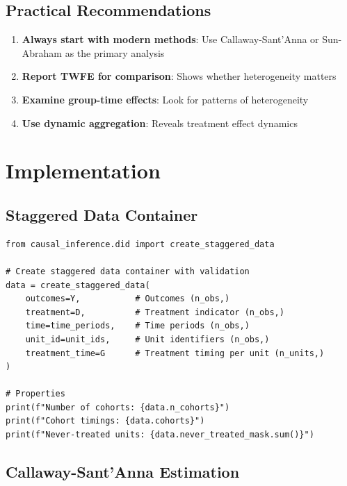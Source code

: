 \subsection{Practical Recommendations}

\begin{enumerate}
    \item \textbf{Always start with modern methods}: Use Callaway-Sant'Anna or Sun-Abraham as the primary analysis
    \item \textbf{Report TWFE for comparison}: Shows whether heterogeneity matters
    \item \textbf{Examine group-time effects}: Look for patterns of heterogeneity
    \item \textbf{Use dynamic aggregation}: Reveals treatment effect dynamics
\end{enumerate}

\section{Implementation}
\label{sec:modern_implementation}

\subsection{Staggered Data Container}

\begin{verbatim}
from causal_inference.did import create_staggered_data

# Create staggered data container with validation
data = create_staggered_data(
    outcomes=Y,           # Outcomes (n_obs,)
    treatment=D,          # Treatment indicator (n_obs,)
    time=time_periods,    # Time periods (n_obs,)
    unit_id=unit_ids,     # Unit identifiers (n_obs,)
    treatment_time=G      # Treatment timing per unit (n_units,)
)

# Properties
print(f"Number of cohorts: {data.n_cohorts}")
print(f"Cohort timings: {data.cohorts}")
print(f"Never-treated units: {data.never_treated_mask.sum()}")
\end{verbatim}

\subsection{Callaway-Sant'Anna Estimation}

